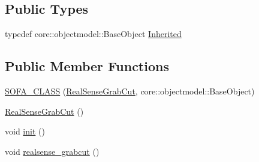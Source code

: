\subsection*{Public Types}
\begin{DoxyCompactItemize}
\item 
typedef core\+::objectmodel\+::\+Base\+Object \hyperlink{classsofa_1_1rgbdtracking_1_1_real_sense_grab_cut_a3d3643071d86257ce05bd3e86a603763}{Inherited}
\end{DoxyCompactItemize}
\subsection*{Public Member Functions}
\begin{DoxyCompactItemize}
\item 
\hyperlink{classsofa_1_1rgbdtracking_1_1_real_sense_grab_cut_ab15c9f5be96ddd1ab0aefdab7701ad2b}{S\+O\+F\+A\+\_\+\+C\+L\+A\+SS} (\hyperlink{classsofa_1_1rgbdtracking_1_1_real_sense_grab_cut}{Real\+Sense\+Grab\+Cut}, core\+::objectmodel\+::\+Base\+Object)
\item 
\hyperlink{classsofa_1_1rgbdtracking_1_1_real_sense_grab_cut_ac99b63b2f756c9ac8073032d78ef334e}{Real\+Sense\+Grab\+Cut} ()
\item 
void \hyperlink{classsofa_1_1rgbdtracking_1_1_real_sense_grab_cut_a07ca12538fc84db6c54dfb9d4302a66b}{init} ()
\item 
void \hyperlink{classsofa_1_1rgbdtracking_1_1_real_sense_grab_cut_abd67d6e789b641b9ca90ad9b221b8ad4}{realsense\+\_\+grabcut} ()
\end{DoxyCompactItemize}
